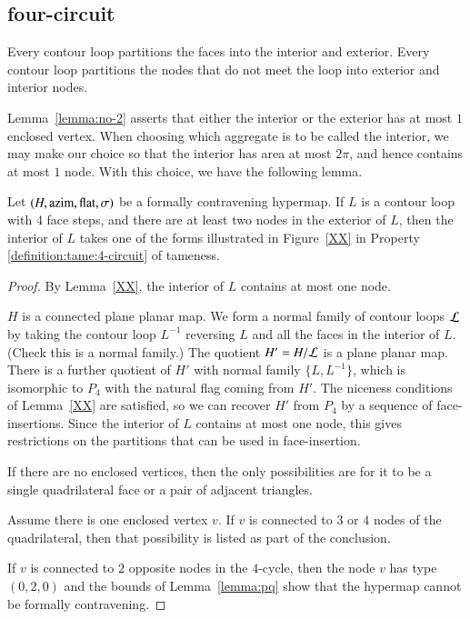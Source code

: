 \begin{lemma}
\begin{lemma}
\subsection{four-circuit}

Every contour loop partitions the faces into the interior and
exterior.  Every contour loop partitions the nodes that do not meet
the loop into exterior and interior nodes.
%

Lemma~\ref{lemma:no-2} asserts that either the interior or the
exterior has at most $1$ enclosed vertex.   When choosing which
aggregate is to be called the interior, we may make our choice so
that the interior has area at most $2\pi$, and hence contains at
most $1$ node. With this choice, we have the following lemma.

\begin{lemma}
Let $(H,{\operatorname{azim}},\operatorname{flat},\sigma)$ be a formally contravening hypermap. If
$L$ is a contour loop with $4$ face steps, and there are at least
two nodes in the exterior of $L$, then the interior of $L$ takes one
of the forms illustrated in Figure~\ref{XX} in Property
    \ref{definition:tame:4-circuit} of tameness.
\end{lemma}

\begin{proof}
By Lemma~\ref{XX}, the interior of $L$ contains at most one node.

$H$ is a connected plane planar map.  We form a normal family of
contour loops ${\cal L}$ by taking the contour loop $L^{-1}$
reversing $L$ and all the faces in the interior of $L$.
(Check this is a normal family.)  The quotient $H' = H/{\cal L}$ is
a plane planar map.  There is a further quotient of $H'$ with normal
family $\{L,L^{-1}\}$, which is isomorphic to $P_4$ with the natural
flag coming from $H'$.  The niceness conditions of Lemma~\ref{XX} are
satisfied, so we can recover $H'$ from $P_4$ by a sequence of
face-insertions.  Since the interior of $L$ contains at most one
node, this gives restrictions on the partitions that can be used in
face-insertion.

If there are no enclosed vertices, then the only possibilities are
for it to be a single quadrilateral face or a pair of adjacent
triangles.

Assume there is one enclosed vertex $v$.  If $v$ is connected to $3$
or $4$ nodes of the quadrilateral, then that possibility is listed
as part of the conclusion.

If $v$ is connected to $2$ opposite nodes in the $4$-cycle, then the
node $v$ has type $(0,2,0)$ and the bounds of
Lemma~\ref{lemma:pq} show that the hypermap cannot be formally
contravening.


\end{proof}
\end{lemma}
\end{lemma}
